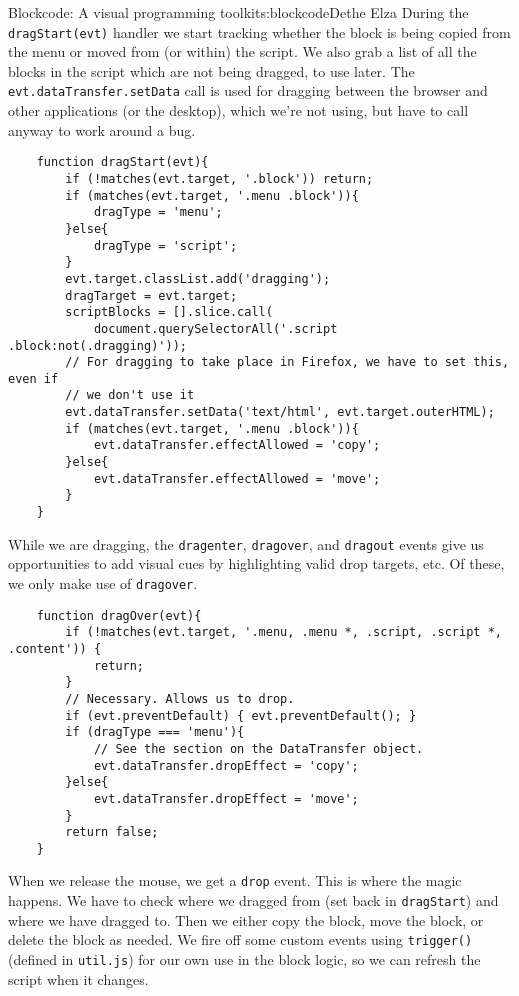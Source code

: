 \begin{aosachapter}{Blockcode: A visual programming toolkit}{s:blockcode}{Dethe Elza}
During the \texttt{dragStart(evt)} handler we start tracking whether the
block is being copied from the menu or moved from (or within) the
script. We also grab a list of all the blocks in the script which are
not being dragged, to use later. The \texttt{evt.dataTransfer.setData}
call is used for dragging between the browser and other applications (or
the desktop), which we're not using, but have to call anyway to work
around a bug.

\begin{verbatim}
    function dragStart(evt){
        if (!matches(evt.target, '.block')) return;
        if (matches(evt.target, '.menu .block')){
            dragType = 'menu';
        }else{
            dragType = 'script';
        }
        evt.target.classList.add('dragging');
        dragTarget = evt.target;
        scriptBlocks = [].slice.call(
            document.querySelectorAll('.script .block:not(.dragging)'));
        // For dragging to take place in Firefox, we have to set this, even if
        // we don't use it
        evt.dataTransfer.setData('text/html', evt.target.outerHTML);
        if (matches(evt.target, '.menu .block')){
            evt.dataTransfer.effectAllowed = 'copy';
        }else{
            evt.dataTransfer.effectAllowed = 'move';
        }
    }
\end{verbatim}

While we are dragging, the \texttt{dragenter}, \texttt{dragover}, and
\texttt{dragout} events give us opportunities to add visual cues by
highlighting valid drop targets, etc. Of these, we only make use of
\texttt{dragover}.

\begin{verbatim}
    function dragOver(evt){
        if (!matches(evt.target, '.menu, .menu *, .script, .script *, .content')) {
            return;
        }
        // Necessary. Allows us to drop.
        if (evt.preventDefault) { evt.preventDefault(); }
        if (dragType === 'menu'){
            // See the section on the DataTransfer object.
            evt.dataTransfer.dropEffect = 'copy';  
        }else{
            evt.dataTransfer.dropEffect = 'move';
        }
        return false;
    }
\end{verbatim}

When we release the mouse, we get a \texttt{drop} event. This is where
the magic happens. We have to check where we dragged from (set back in
\texttt{dragStart}) and where we have dragged to. Then we either copy
the block, move the block, or delete the block as needed. We fire off
some custom events using \texttt{trigger()} (defined in
\texttt{util.js}) for our own use in the block logic, so we can refresh
the script when it changes.


\end{aosachapter}
